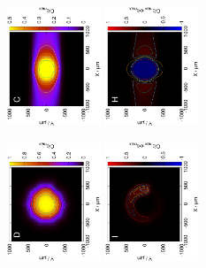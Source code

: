 \begin{figure}[H]
\includegraphics[trim = 20mm 30mm 0mm 20mm, clip, width=0.25\textwidth, angle=-90]{img/sim/comb_sim.eps} \includegraphics[trim = 20mm 30mm 0mm 20mm, clip, width=0.25\textwidth, angle=-90]{img/sim/comb_delta.eps}

\includegraphics[trim = 20mm 30mm 0mm 20mm, clip, width=0.25\textwidth, angle=-90]{img/sim/web_sim.eps} \includegraphics[trim = 20mm 30mm 0mm 20mm, clip, width=0.25\textwidth, angle=-90]{img/sim/web_delta.eps}


\end{figure}
